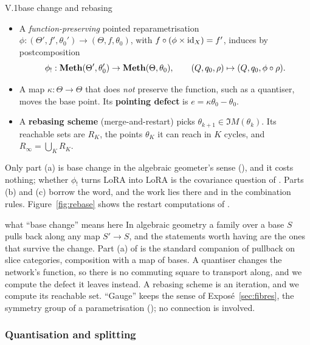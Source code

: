 \begin{definition}{V.1}{base change and rebasing}
\begin{itemize}
  \item[(a)] A \emph{function-preserving} pointed reparametrisation $\phi:(\Theta',f',\theta_0')\to(\Theta,f,\theta_0)$,
  with $f\circ(\phi\times\mathrm{id}_X)=f'$, induces by postcomposition
  \[\phi_!:\mathbf{Meth}(\Theta',\theta_0')\to\mathbf{Meth}(\Theta,\theta_0),\qquad(Q,q_0,\rho)\mapsto(Q,q_0,\phi\circ\rho).\]
  \item[(b)] A map $\kappa:\Theta\to\Theta$ that does \emph{not} preserve the function, such as a quantiser, moves the
  base point. Its \textbf{pointing defect} is $e=\kappa\theta_0-\theta_0$.
  \item[(c)] A \textbf{rebasing scheme} (merge-and-restart) picks $\theta_{k+1}\in\Im M(\theta_k)$. Its reachable sets
  are $R_K$, the points $\theta_K$ it can reach in $K$ cycles, and $R_\infty=\bigcup_KR_K$.
\end{itemize}
\end{definition}

Only part (a) is base change in the algebraic geometer's sense (), and it costs nothing; whether $\phi_!$
turns LoRA into LoRA is the covariance question of . Parts (b) and (c) borrow the word, and
the work lies there and in the combination rules. Figure~\ref{fig:rebase} shows the restart computations of
.

\begin{remark*}{what ``base change'' means here}
In algebraic geometry a family over a base $S$ pulls back along any map $S'\to S$, and the statements worth having are
the ones that survive the change. Part (a) of  is the standard companion of pullback on slice
categories, composition with a map of bases. A quantiser changes the network's function, so there is no commuting
square to transport along, and we compute the defect it leaves instead. A rebasing scheme is an iteration, and we
compute its reachable set. ``Gauge'' keeps the sense of Exposé~\ref{sec:fibres}, the symmetry group of a
parametrisation (); no connection is involved.
\end{remark*}

\subsubsection{Quantisation and splitting}\label{sec:base-quant}

